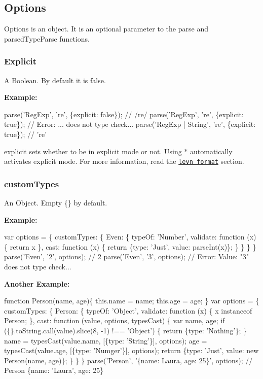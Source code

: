 \subsection*{Options}

Options is an object. It is an optional parameter to the {\ttfamily parse} and {\ttfamily parsed\+Type\+Parse} functions.

\subsubsection*{Explicit}

A {\ttfamily Boolean}. By default it is {\ttfamily false}.

{\bfseries Example\+:}


\begin{DoxyCode}
parse('RegExp', 're', \{explicit: false\});          // /re/
parse('RegExp', 're', \{explicit: true\});           // Error: ... does not type check...
parse('RegExp | String', 're', \{explicit: true\});  // 're'
\end{DoxyCode}


{\ttfamily explicit} sets whether to be in explicit mode or not. Using {\ttfamily $\ast$} automatically activates explicit mode. For more information, read the \href{#levn-format}{\tt levn format} section.

\subsubsection*{custom\+Types}

An {\ttfamily Object}. Empty {\ttfamily \{\}} by default.

{\bfseries Example\+:}


\begin{DoxyCode}
var options = \{
  customTypes: \{
    Even: \{
      typeOf: 'Number',
      validate: function (x) \{
        return x %
      \},
      cast: function (x) \{
        return \{type: 'Just', value: parseInt(x)\};
      \}
    \}
  \}
\}
parse('Even', '2', options); // 2
parse('Even', '3', options); // Error: Value: "3" does not type check...
\end{DoxyCode}


{\bfseries Another Example\+:} 
\begin{DoxyCode}
function Person(name, age)\{
  this.name = name;
  this.age = age;
\}
var options = \{
  customTypes: \{
    Person: \{
      typeOf: 'Object',
      validate: function (x) \{
        x instanceof Person;
      \},
      cast: function (value, options, typesCast) \{
        var name, age;
        if (\{\}.toString.call(value).slice(8, -1) !== 'Object') \{
          return \{type: 'Nothing'\};
        \}
        name = typesCast(value.name, [\{type: 'String'\}], options);
        age = typesCast(value.age, [\{type: 'Numger'\}], options);
        return \{type: 'Just', value: new Person(name, age)\};
    \}
  \}
\}
parse('Person', '\{name: Laura, age: 25\}', options); // Person \{name: 'Laura', age: 25\}
\end{DoxyCode}


